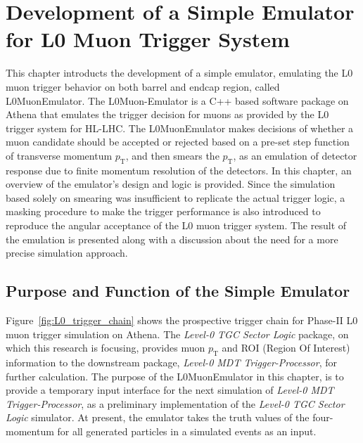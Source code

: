 \chapter{Development of a Simple Emulator for L0 Muon Trigger System} \label{ch:L0MuonEmulator}
This chapter introducts the development of a simple emulator, emulating the L0 muon trigger behavior on both barrel and endcap region, called L0MuonEmulator. The L0Muon-Emulator is a C++ based software package on Athena that emulates the trigger decision for muons as provided by the L0 trigger system for HL-LHC. The L0MuonEmulator makes decisions of whether a muon candidate should be accepted or rejected based on a pre-set step function of transverse momentum $p_\mathrm{T}$, and then smears the $p_\mathrm{T}$, as an emulation of detector response due to finite momentum resolution of the detectors. In this chapter, an overview of the emulator's design and logic is provided. Since the simulation based solely on smearing was insufficient to replicate the actual trigger logic, a masking procedure to make the trigger performance is also introduced to reproduce the angular acceptance of the L0 muon trigger system. The result of the emulation is presented along with a discussion about the need for a more precise simulation approach.
\section{Purpose and Function of the Simple Emulator} \label{sec:L0MuonPurpose}
Figure~\ref{fig:L0_trigger_chain} shows the prospective trigger chain for Phase-II L0 muon trigger simulation on Athena. The \textit{Level-0 TGC Sector Logic} package, on which this research is focusing, provides muon $p_\mathrm{T}$ and ROI (Region Of Interest) information to the downstream package, \textit{Level-0 MDT Trigger-Processor}, for further calculation. The purpose of the L0MuonEmulator in this chapter, is to provide a temporary input interface for the next simulation of \textit{Level-0 MDT Trigger-Processor}, as a preliminary implementation of the \textit{Level-0 TGC Sector Logic} simulator. At present, the emulator takes the truth values of the four-momentum for all generated particles in a simulated events as an input. 

